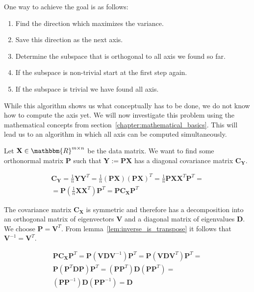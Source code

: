 One way to achieve the goal is as follows:
\begin{enumerate}
	\item Find the direction which maximizes the variance.
	\item Save this direction as the next axis.
	\item Determine the subspace that is orthogonal to all axis we found so far.
	\item If the subspace is non-trivial start at the first step again.
	\item If the subspace is trivial we have found all axis.
\end{enumerate}

While this algorithm shows us what conceptually has to be done, we do not know how to compute the axis yet. We will now investigate this problem using the mathematical concepts from section~\ref{chapter:mathematical_basics}. This will lead us to an algorithm in which all axis can be computed simultaneously.

Let $\mathbf{X} \in \mathbbm{R}^{m\times n}$ be the data matrix. We want to find some orthonormal matrix $\mathbf{P}$ such that $\mathbf{Y}:=\mathbf{PX}$ has a diagonal covariance matrix $\mathbf{C}_{\mathbf{Y}}$.

\begin{align*}
	\mathbf{C}_{\mathbf{Y}} = \frac{1}{n}\mathbf{YY}^T = \frac{1}{n}(\mathbf{PX})(\mathbf{PX})^T = \frac{1}{n}\mathbf{PX}\mathbf{X}^T\mathbf{P}^T =\\
	= \mathbf{P}(\frac{1}{n}\mathbf{X}\mathbf{X}^T)\mathbf{P}^T = \mathbf{P}\mathbf{C}_\mathbf{X}\mathbf{P}^T
\end{align*}

The covariance matrix $\mathbf{C}_\mathbf{X}$ is symmetric and therefore has a decomposition into an orthogonal matrix of eigenvectors $\mathbf{V}$ and a diagonal matrix of eigenvalues $\mathbf{D}$. We choose $\mathbf{P}=\mathbf{V}^T$. From lemma~\ref{lem:inverse_is_transpose} it follows that $\mathbf{V}^{-1} = \mathbf{V}^T$.

\begin{align*}
	\mathbf{P}\mathbf{C}_\mathbf{X}\mathbf{P}^T = \mathbf{P}(\mathbf{VDV}^{-1})\mathbf{P}^T = \mathbf{P}(\mathbf{VDV}^{T})\mathbf{P}^T =\\
	\mathbf{P}(\mathbf{P}^T\mathbf{DP})\mathbf{P}^T = (\mathbf{P}\mathbf{P}^T)\mathbf{D}(\mathbf{P}\mathbf{P}^T) =\\
	(\mathbf{P}\mathbf{P}^{-1})\mathbf{D}(\mathbf{P}\mathbf{P}^{-1}) = \mathbf{D}
\end{align*}

